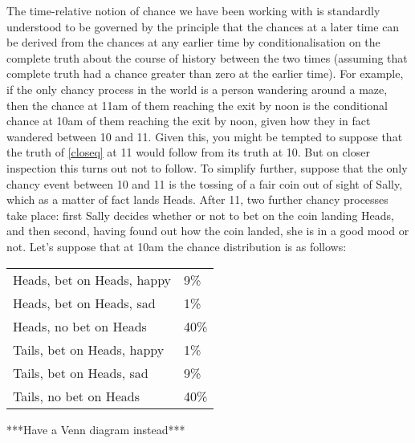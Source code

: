 \documentclass[If.tex]{subfiles}
\begin{document}
The time-relative notion of chance we have been working with is standardly understood to be governed by the principle that the chances at a later time can be derived from the chances at any earlier time by conditionalisation on the complete truth about the course of history between the two times (assuming that complete truth had a chance greater than zero at the earlier time).  For example, if the only chancy process in the world is a person wandering around a maze, then the chance at 11am of them reaching the exit by noon is the conditional chance at 10am of them reaching the exit by noon, given how they in fact wandered between 10 and 11.  Given this, you might be tempted to suppose that the truth of \ref{closeq} at 11 would follow from its truth at 10.  But on closer inspection this turns out not to follow.  To simplify further, suppose that the only chancy event between 10 and 11 is the tossing of a fair coin out of sight of Sally, which as a matter of fact lands Heads.  After 11, two further chancy processes take place: first Sally decides whether or not to bet on the coin landing Heads, and then second, having found out how the coin landed, she is in a good mood or not.  Let's suppose that at 10am the chance distribution is as follows:
\begin{prop}
	\item
	\begin{tabular}{ll}
		Heads, bet on Heads, happy & 9\% \\
		Heads, bet on Heads, sad & 1\% \\
		Heads, no bet on Heads & 40\% \\
		Tails, bet on Heads, happy & 1\% \\
		Tails, bet on Heads, sad & 9\% \\
		Tails, no bet on Heads &40\%
	\end{tabular}
\end{prop}
***Have a Venn diagram instead***
\end{document}
